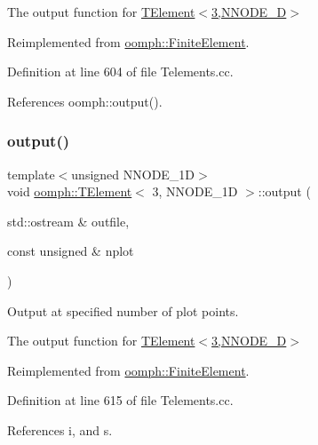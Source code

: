 The output function for \hyperlink{classoomph_1_1TElement_3_013_00_01NNODE__1D_01_4}{T\+Element$<$3,\+N\+N\+O\+D\+E\+\_\+D$>$} 

Reimplemented from \hyperlink{classoomph_1_1FiniteElement_a2ad98a3d2ef4999f1bef62c0ff13f2a7}{oomph\+::\+Finite\+Element}.



Definition at line 604 of file Telements.\+cc.



References oomph\+::output().

\mbox{\label{classoomph_1_1TElement_3_013_00_01NNODE__1D_01_4_afbe11abf64903e58d4d265ea503a5af0}} 
\subsubsection{\texorpdfstring{output()}{output()}\hspace{0.1cm}{\footnotesize\ttfamily [2/4]}}
{\footnotesize\ttfamily template$<$unsigned N\+N\+O\+D\+E\+\_\+1D$>$ \\
void \hyperlink{classoomph_1_1TElement}{oomph\+::\+T\+Element}$<$ 3, N\+N\+O\+D\+E\+\_\+1D $>$\+::output (\begin{DoxyParamCaption}\item[{std\+::ostream \&}]{outfile,  }\item[{const unsigned \&}]{nplot }\end{DoxyParamCaption})\hspace{0.3cm}{\ttfamily [virtual]}}



Output at specified number of plot points. 

The output function for \hyperlink{classoomph_1_1TElement_3_013_00_01NNODE__1D_01_4}{T\+Element$<$3,\+N\+N\+O\+D\+E\+\_\+D$>$} 

Reimplemented from \hyperlink{classoomph_1_1FiniteElement_afa9d9b2670f999b43e6679c9dd28c457}{oomph\+::\+Finite\+Element}.



Definition at line 615 of file Telements.\+cc.



References i, and s.

